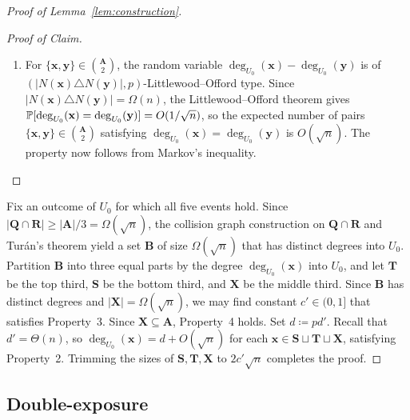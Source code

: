 \begin{proof}[Proof of Lemma~\ref{lem:construction}]
\begin{proof}[Proof of Claim]
\begin{enumerate}
    \[
      \prob\left[|N_{U_0}(\mathbf{x}) \triangle N_{U_0}(\mathbf{y})| < \frac{p}{2}|N(\mathbf{x}) \triangle N(\mathbf{y})|\right] = e^{-\Omega(n)} = o(n^{-1}).
    \]
    The result follows from summing over $\{\mathbf{x}, \mathbf{y}\} \in \binom{\mathbf{A}}{2}$ and invoking the union bound.
    \item[(v)] For $\{\mathbf{x}, \mathbf{y}\} \in \binom{\mathbf{A}}{2}$, the random variable $\deg_{U_0}(\mathbf{x}) - \deg_{U_0}(\mathbf{y})$ is of $(|N(\mathbf{x}) \triangle N(\mathbf{y})|, p)$-Littlewood--Offord type. Since $|N(\mathbf{x}) \triangle N(\mathbf{y})| = \Omega(n)$, the Littlewood--Offord theorem gives $\mathbb{P}[\operatorname{deg}_{U_0}(\mathbf{x}) = \operatorname{deg}_{U_0}(\mathbf{y})] = O(1/\sqrt{n})$, so the expected number of pairs $\{\mathbf{x}, \mathbf{y}\} \in \binom{\mathbf{A}}{2}$ satisfying $\deg_{U_0}(\mathbf{x}) = \deg_{U_0}(\mathbf{y})$ is $O(\sqrt{n})$. The property now follows from Markov's inequality.
  \end{enumerate}
\end{proof}

Fix an outcome of $U_0$ for which all five events hold. Since $|\mathbf{Q} \cap \mathbf{R}| \geq |\mathbf{A}|/3 = \Omega(\sqrt{n})$, the collision graph construction on $\mathbf{Q} \cap \mathbf{R}$ and Tur\'{a}n's theorem yield a set $\mathbf{B}$ of size $\Omega(\sqrt{n})$ that has distinct degrees into $U_0$. Partition $\mathbf{B}$ into three equal parts by the degree $\deg_{U_0}(\mathbf{x})$ into $U_0$, and let $\mathbf{T}$ be the top third, $\mathbf{S}$ be the bottom third, and $\mathbf{X}$ be the middle third. Since $\mathbf{B}$ has distinct degrees and $|\mathbf{X}| = \Omega(\sqrt{n})$, we may find constant $c' \in (0, 1]$ that satisfies Property~3. Since $\mathbf{X} \subseteq \mathbf{A}$, Property~4 holds. Set $d \coloneqq pd'$. Recall that $d' = \Theta(n)$, so $\deg_{U_0}(\mathbf{x}) = d + O(\sqrt{n})$ for each $\mathbf{x} \in \mathbf{S} \sqcup \mathbf{T} \sqcup \mathbf{X}$, satisfying Property~2. Trimming the sizes of $\mathbf{S}, \mathbf{T}, \mathbf{X}$ to $2c'\sqrt{n}$ completes the proof.
\end{proof}

\subsection{Double-exposure}
\label{sec:double-exposure}


